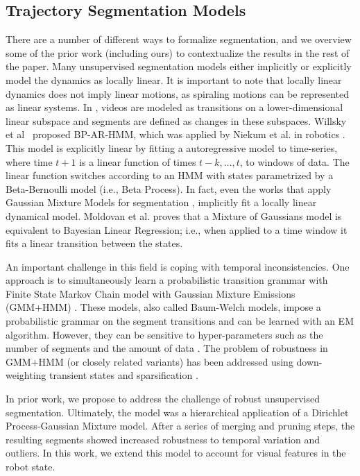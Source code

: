 \subsection{Trajectory Segmentation Models}
There are a number of different ways to formalize segmentation, and we overview  some of the prior work (including ours) to contextualize the results in the rest of the paper.
Many unsupervised segmentation models either implicitly or explicitly model the dynamics as locally linear.
It is important to note that locally linear dynamics does not imply linear motions, as spiraling motions can be represented as linear systems. 
In \cite{elhamifar2009sparse}, videos are modeled as transitions on a lower-dimensional linear subspace and segments are defined as changes in these subspaces.
Willsky et al~\cite{willsky2009sharing} proposed BP-AR-HMM, which was applied by Niekum et al. in robotics \cite{niekum2012learning}.
This model is explicitly linear by fitting a autoregressive model to time-series, where time $t+1$ is a linear function of times $t-k,\ldots, t$, to windows of data. 
The linear function switches according to an HMM with states parametrized by a Beta-Bernoulli model (i.e., Beta Process). 
In fact, even the works that apply Gaussian Mixture Models for segmentation \cite{calinon2010learning, lee2015autonomous, kruger2012imitation}, implicitly fit a locally linear dynamical model.
Moldovan et al. \cite{moldovan2013dirichlet} proves that a Mixture of Gaussians model is equivalent to Bayesian Linear Regression; i.e., when applied to a time window it fits a linear transition between the states.

An important challenge in this field is coping with temporal inconsistencies.
One approach is to simultaneously learn a probabilistic transition grammar with Finite State Markov Chain model with Gaussian Mixture Emissions (GMM+HMM) \cite{asfour2006imitation,calinon2004stochastic,kruger2010learning, vakanski2012trajectory}.
These models, also called Baum-Welch models, impose a probabilistic grammar on the segment transitions and can be learned with an EM algorithm.
However, they can be sensitive to hyper-parameters such as the number of segments and the amount of data \cite{tang2010toward}.
The problem of robustness in GMM+HMM (or closely related variants) has been addressed using down-weighting transient states \cite{kulic2008scaffolding} and sparsification \cite{grollman2010incremental}.

In prior work, we propose \sys to address the challenge of robust unsupervised segmentation.
Ultimately, the model was a hierarchical application of a Dirichlet Process-Gaussian Mixture model.
After a series of merging and pruning steps, the resulting segments showed increased robustness to temporal variation and outliers.
In this work, we extend this model to account for visual features in the robot state.

